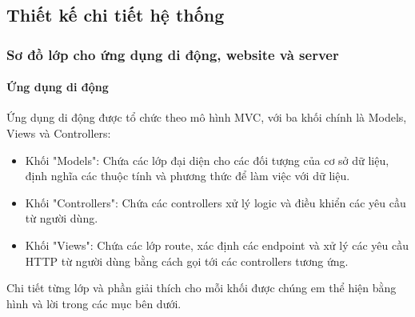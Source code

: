 \subsection{Thiết kế chi tiết hệ thống}

\subsubsection{Sơ đồ lớp cho ứng dụng di động, website và server}

\paragraph{Ứng dụng di động}
\mbox{}

Ứng dụng di động được tổ chức theo mô hình MVC, với ba khối chính là Models, Views và Controllers:
  
\begin{itemize}
  \item Khối "Models": Chứa các lớp đại diện cho các đối tượng của cơ sở dữ liệu, định nghĩa các thuộc tính và phương thức để làm việc với dữ liệu.
 
  \item Khối "Controllers": Chứa các controllers xử lý logic và điều khiển các yêu cầu từ người dùng.

  \item Khối "Views": Chứa các lớp route, xác định các endpoint và xử lý các yêu cầu HTTP từ người dùng bằng cách gọi tới các controllers tương ứng.
\end{itemize}

Chi tiết từng lớp và phần giải thích cho mỗi khối được chúng em thể hiện bằng hình và lời trong các mục bên dưới. 

